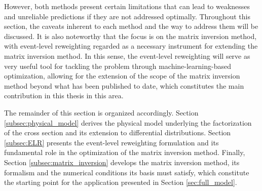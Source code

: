 However, both methods present certain limitations that can lead to weaknesses and unreliable predictions if they are not addressed optimally. Throughout this section, the caveats inherent to each method and the way to address them will be discussed. It is also noteworthy that the focus is on the matrix inversion method, with event-level reweighting regarded as a necessary instrument for extending the matrix inversion method. In this sense, the event-level reweighting will serve as very useful tool for tackling the problem through machine-learning-based optimization, allowing for the extension of the scope of the matrix inversion method beyond what has been published to date, which constitutes the main contribution in this thesis in this area.

The remainder of this section is organized accordingly. Section \ref{subsec:physical_model} derives the physical model underlying the factorization of the cross section and its extension to differential distributions. Section \ref{subsec:ELR} presents the event-level reweighting formulation and its fundamental role in the optimization of the matrix inversion method. Finally, Section \ref{subsec:matrix_inversion} develops the matrix inversion method, its formalism and the numerical conditions its basis must satisfy, which constitute the starting point for the application presented in Section \ref{sec:full_model}.






